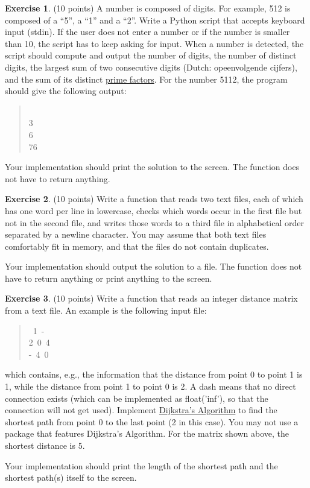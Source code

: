 \documentclass[11pt]{article}
\theoremstyle{definition}
\newtheorem{exercise}{Exercise}
\newcommand{\blankline}{\par\vspace{5mm}}
\begin{document}
\begin{exercise}
	(10 points) A number is composed of digits. For example, 512 is composed of a “5”, a “1” and  a “2”. Write a Python script that accepts keyboard input (stdin). If the user does not enter a number or if the number is smaller than 10, the script has to keep asking for input. When a number is detected, the script should compute and output the number of digits, the number of distinct digits, the largest sum of two consecutive digits  (Dutch: opeenvolgende cijfers), and the sum of its distinct \href{https://en.wikipedia.org/wiki/Prime_factor}{prime factors}. For the number 5112, the program should give the following output:
	
	\begin{quote}{\ttfamily \raggedright {}\\
			3\\
			6\\
			76
		}
	\end{quote}

	\noindent Your implementation should print the solution to the screen. The function does not have to return anything.
\end{exercise}

\begin{exercise}
	(10 points) Write a function that reads two text files, each of which has one word per line in lowercase, checks which words occur in
	the first file but not in the second file, and writes those words to a third file in alphabetical order separated by a newline character. You	may assume that both text files comfortably fit in memory, and that the	files do not contain duplicates.
	
	\blankline \noindent Your implementation should output the solution to a file. The function does not have to return anything or print anything to the screen.	
\end{exercise}

\begin{exercise}
	(10 points) Write a function that reads an integer distance matrix from a text file. An example is the following input file:
	\begin{quote}{\ttfamily \raggedright {}~1~-\\
			2~0~4\\
			-~4~0
		}
	\end{quote}

	\noindent which contains, e.g., the information that the distance from point 0 to point 1 is 1, while the distance from point 1 to point 0 is 2. A dash means that no direct connection exists (which can be implemented as float('inf'), so that the connection will not get used). Implement \href{https://en.wikipedia.org/wiki/Dijkstra's_algorithm\#Pseudocode}{Dijkstra’s Algorithm} to find the shortest path from point 0 to the last point (2 in this case). You may not use a package that features Dijkstra’s Algorithm. For the matrix shown above, the shortest distance is 5.

	Your implementation should print the length of the shortest path and the shortest path(s) itself to the screen.
\end{exercise}
\end{document}
